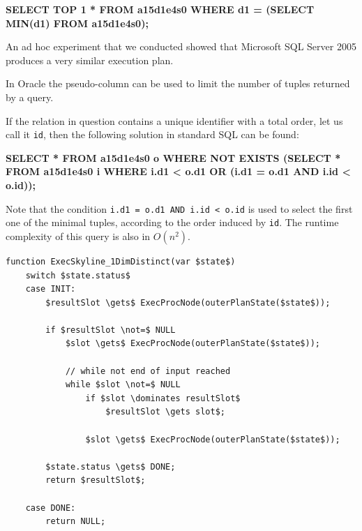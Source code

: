 \begin{interactive}
\textbf{SELECT TOP 1 * FROM a15d1e4s0 WHERE d1 = (SELECT MIN(d1) FROM a15d1e4s0);}
\end{interactive}

\noindent
An ad hoc experiment that we conducted showed that Microsoft SQL Server
2005 produces a very similar execution plan.

In Oracle the pseudo-column 
can be used to limit the number of tuples returned by a query.

If the relation in question contains a unique identifier with a total
order, let us call it \texttt{id}, then the following solution in
standard SQL can be found:

\begin{interactive}
\textbf{SELECT * FROM a15d1e4s0 o WHERE NOT EXISTS
    (SELECT * FROM a15d1e4s0 i WHERE i.d1 < o.d1 OR (i.d1 = o.d1 AND i.id < o.id));}
\end{interactive}

\noindent
Note that the condition \texttt{i.d1 = o.d1 AND i.id < o.id} is used to
select the first one of the minimal tuples, according to the order induced by \texttt{id}. The runtime complexity of this query is also in $O(n^2)$.

\begin{lstlisting}[language=pseudo,
caption={Special case: 1 dimensional distinct},
label={code:1dimdistinct}
]
function ExecSkyline_1DimDistinct(var $state$)
	switch $state.status$
	case INIT:
		$resultSlot \gets$ ExecProcNode(outerPlanState($state$));

		if $resultSlot \not=$ NULL
			$slot \gets$ ExecProcNode(outerPlanState($state$));

			// while not end of input reached
			while $slot \not=$ NULL
				if $slot \dominates resultSlot$
					$resultSlot \gets slot$;

				$slot \gets$ ExecProcNode(outerPlanState($state$));

		$state.status \gets$ DONE;
		return $resultSlot$;

	case DONE:
		return NULL;
\end{lstlisting}


